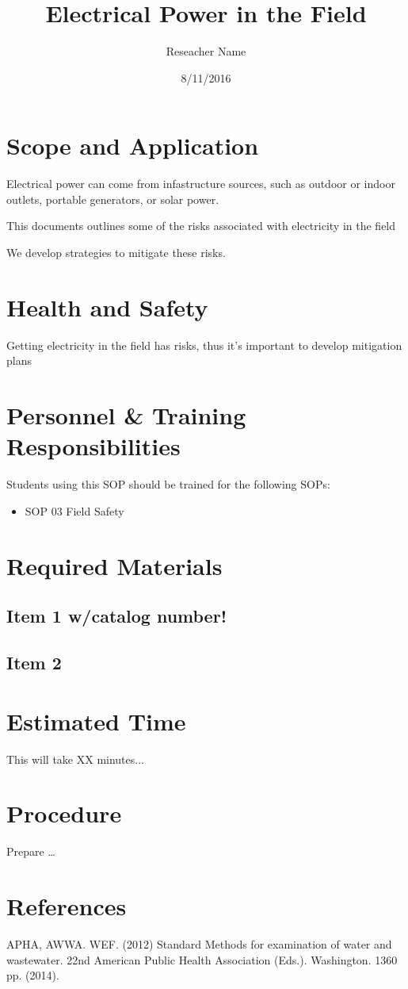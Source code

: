 \documentclass[12pt]{../SOP2}
\title{Electrical Power in the Field}
\date{8/11/2016}
\author{Reseacher Name}
\begin{document}


\maketitle

\section{Scope and Application}

\NP Electrical power can come from infastructure sources, such as outdoor or indoor outlets, portable generators, or solar power.

\NP This documents outlines some of the risks associated with electricity in the field

\NP We develop strategies to mitigate these risks.

\section{Health and Safety}

\NP Getting electricity in the field has risks, thus it's important to develop mitigation plans


\section{Personnel \& Training Responsibilities}

\NP \lipsum[1]

Students using this SOP should be trained for the following SOPs:

\begin{itemize}
  \item SOP 03 Field Safety
\end{itemize}


\section{Required Materials}

\subsection{Item 1 w/catalog number!}
\subsection{Item 2}

\section{Estimated Time}

\NP This will take XX minutes...

\section{Procedure}

\NP Prepare \dots

\NP

\section{References}

\NP APHA, AWWA. WEF. (2012) Standard Methods for examination of water and wastewater. 22nd American Public Health Association (Eds.). Washington. 1360 pp. (2014).
\end{document}
